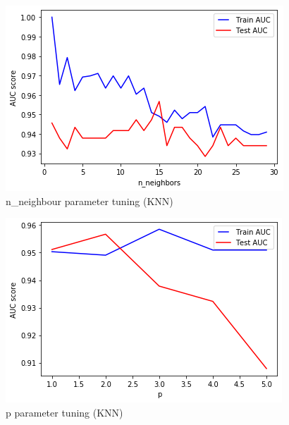 \documentclass[journal]{IEEEtran}
\begin{document}
\begin{figure}[H]
	\centering
	\includegraphics[width=\linewidth]{neighboursTune_KNN.png}
	\caption{n\_neighbour parameter tuning (KNN)}
	\label{Fig:knnNeighbor}
\end{figure}

\begin{figure}[H]
	\centering
	\includegraphics[width=\linewidth]{pTune_KNN.png}
	\caption{p parameter tuning (KNN)}
	\label{Fig:knnp}
\end{figure}
\end{document}
